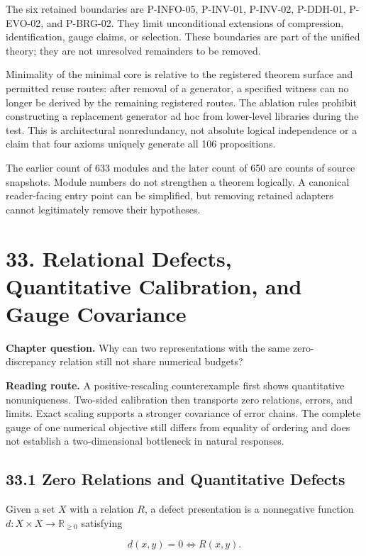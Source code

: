 \documentclass[
  english,
  11pt,
  oneside]{book}
\begin{document}
The six retained boundaries are P-INFO-05, P-INV-01, P-INV-02, P-DDH-01, P-EVO-02, and P-BRG-02. They limit unconditional extensions of compression, identification, gauge claims, or selection. These boundaries are part of the unified theory; they are not unresolved remainders to be removed.

Minimality of the minimal core is relative to the registered theorem surface and permitted reuse routes: after removal of a generator, a specified witness can no longer be derived by the remaining registered routes. The ablation rules prohibit constructing a replacement generator ad hoc from lower-level libraries during the test. This is architectural nonredundancy, not absolute logical independence or a claim that four axioms uniquely generate all 106 propositions.

The earlier count of 633 modules and the later count of 650 are counts of source snapshots. Module numbers do not strengthen a theorem logically. A canonical reader-facing entry point can be simplified, but removing retained adapters cannot legitimately remove their hypotheses.

\chapter{33. Relational Defects, Quantitative Calibration, and Gauge Covariance}\label{ch-33}

\textbf{Chapter question.} Why can two representations with the same zero-discrepancy relation still not share numerical budgets?

\textbf{Reading route.} A positive-rescaling counterexample first shows quantitative nonuniqueness. Two-sided calibration then transports zero relations, errors, and limits. Exact scaling supports a stronger covariance of error chains. The complete gauge of one numerical objective still differs from equality of ordering and does not establish a two-dimensional bottleneck in natural responses.

\section{33.1 Zero Relations and Quantitative Defects}\label{zero-relations-and-quantitative-defects}

Given a set \(X\) with a relation \(R\), a defect presentation is a nonnegative function \(d:X\times X\to\mathbb R_{\ge0}\) satisfying

\[d(x,y)=0\iff R(x,y).\]
\end{document}
